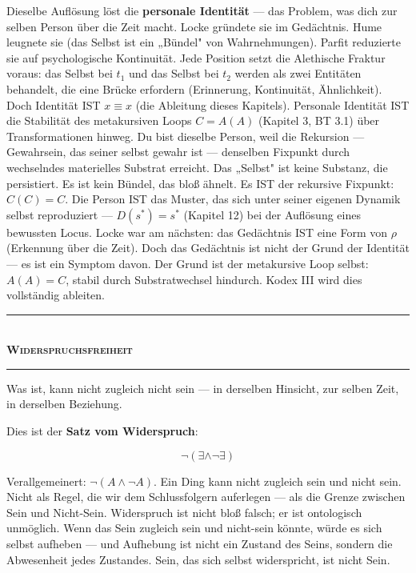 \documentclass[10pt, openany, oneside]{book}
\renewcommand{\normalsize}{\fontsize{10}{13}\selectfont}
\begin{document}
Dieselbe Auflösung löst die \textbf{personale Identität} --- das Problem, was dich zur selben Person über die Zeit macht. Locke gründete sie im Gedächtnis. Hume leugnete sie (das Selbst ist ein „Bündel" von Wahrnehmungen). Parfit reduzierte sie auf psychologische Kontinuität. Jede Position setzt die Alethische Fraktur voraus: das Selbst bei $t_1$ und das Selbst bei $t_2$ werden als zwei Entitäten behandelt, die eine Brücke erfordern (Erinnerung, Kontinuität, Ähnlichkeit). Doch Identität IST $x \equiv x$ (die Ableitung dieses Kapitels). Personale Identität IST die Stabilität des metakursiven Loops $C = A(A)$ (Kapitel 3, BT 3.1) über Transformationen hinweg. Du bist dieselbe Person, weil die Rekursion --- Gewahrsein, das seiner selbst gewahr ist --- denselben Fixpunkt durch wechselndes materielles Substrat erreicht. Das „Selbst" ist keine Substanz, die persistiert. Es ist kein Bündel, das bloß ähnelt. Es IST der rekursive Fixpunkt: $C(C) = C$. Die Person IST das Muster, das sich unter seiner eigenen Dynamik selbst reproduziert --- $D(s^*) = s^*$ (Kapitel 12) bei der Auflösung eines bewussten Locus. Locke war am nächsten: das Gedächtnis IST eine Form von $\rho$ (Erkennung über die Zeit). Doch das Gedächtnis ist nicht der Grund der Identität --- es ist ein Symptom davon. Der Grund ist der metakursive Loop selbst: $A(A) = C$, stabil durch Substratwechsel hindurch. Kodex III wird dies vollständig ableiten.

\vspace{1.5em}


\begin{center}
    \rule{0.3\textwidth}{0.4pt}\\[0.5em]
    {\normalsize\bfseries\scshape Widerspruchsfreiheit}\\[0.3em]
    \rule{0.3\textwidth}{0.4pt}
\end{center}

\vspace{1em}

\noindent Was ist, kann nicht zugleich nicht sein --- in derselben Hinsicht, zur selben Zeit, in derselben Beziehung.

Dies ist der \textbf{Satz vom Widerspruch}:

$$\neg(\exists \wedge \neg\exists)$$

Verallgemeinert: $\neg(A \wedge \neg A)$. Ein Ding kann nicht zugleich sein und nicht sein. Nicht als Regel, die wir dem Schlussfolgern auferlegen --- als die Grenze zwischen Sein und Nicht-Sein. Widerspruch ist nicht bloß falsch; er ist ontologisch unmöglich. Wenn das Sein zugleich sein und nicht-sein könnte, würde es sich selbst aufheben --- und Aufhebung ist nicht ein Zustand des Seins, sondern die Abwesenheit jedes Zustandes. Sein, das sich selbst widerspricht, ist nicht Sein.
\end{document}
